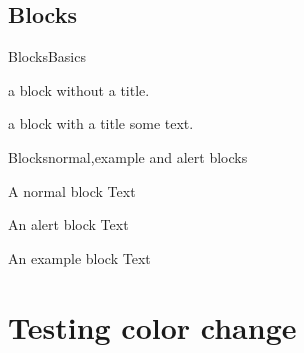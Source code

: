 \documentclass[9pt]{beamer}
\begin{document}
\subsection{Blocks}
\begin{frame}{Blocks}{Basics}
  \begin{block}{}
    a block without a title.
  \end{block}
  \begin{block}{a block with a title}
    some text.
  \end{block}
\end{frame}

\begin{frame}{Blocks}{normal,example and alert blocks}
  \begin{block}{A normal block}
  Text
 \end{block}

 \begin{alertblock}{An alert block}
  Text
 \end{alertblock}

 \begin{exampleblock}{An example block}
   Text
 \end{exampleblock}
\end{frame}


%
%

\newcommand{\testcolorfootline}[1]{%
\pgfaliasimage{figfootline}{figfootline-#1}%
\begin{frame}{Testing color change}
  footline should be #1 here.
\end{frame}
}
%
\newcommand{\testcolorpartpage}[1]{%
\pgfaliasimage{figbackground}{figbackground-#1}%
\begin{frame}[plain]
  \partpage
\end{frame}
}
%
\newcommand{\testcolortitlepage}[1]{%
\pgfaliasimage{figbackground}{figbackground-#1}%
\begin{frame}[plain]
  \titlepage
\end{frame}
}


\section{Testing color change}
\end{document}
